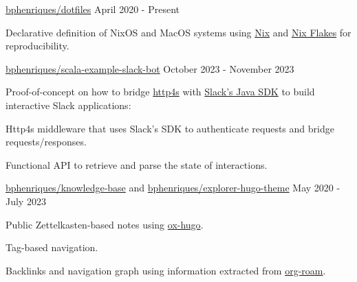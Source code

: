 
\begin{cventries}
  \openSourceEntry
    {\href{https://github.com/bphenriques/dotfiles}{bphenriques/dotfiles}}
    {April 2020 - Present}
    {
    \begin{openSourceDescription}
    Declarative definition of NixOS and MacOS systems using \href{https://nixos.org/}{Nix} and \href{https://nixos.wiki/wiki/Flakes}{Nix Flakes} for reproducibility.
    \end{openSourceDescription}
    \vspace{4mm}
    }

  \vspace{2mm}

\openSourceEntry
    {\href{https://github.com/bphenriques/scala-example-slack-bot}{bphenriques/scala-example-slack-bot}}
    {October 2023 - November 2023}
    {   
    \begin{openSourceDescription}
    Proof-of-concept on how to bridge \href{https://github.com/http4s/http4s}{http4s} with \href{https://github.com/slackapi/java-slack-sdk}{Slack's Java SDK} to build interactive Slack applications:
    \end{openSourceDescription}
    \vspace{8mm}
    \begin{openSourceItems}
        \item Http4s middleware that uses Slack's SDK to authenticate requests and bridge requests/responses.
        \item Functional API to retrieve and parse the state of interactions.
    \end{openSourceItems}
    \vspace{4mm}
    }

  \vspace{2mm}  

  \openSourceEntry
    {\href{https://github.com/bphenriques/knowledge-base}{bphenriques/knowledge-base} and \href{https://github.com/bphenriques/explorer-hugo-theme}{bphenriques/explorer-hugo-theme}}
    {May 2020 - July 2023}
    {    
    \begin{openSourceItems}
        \item Public Zettelkasten-based notes using \href{https://ox-hugo.scripter.co/}{ox-hugo}.
        \item Tag-based navigation.
        \item Backlinks and navigation graph using information extracted from \href{https://www.orgroam.com/}{org-roam}.
    \end{openSourceItems}
    \vspace{4mm}
    }


\end{cventries}
